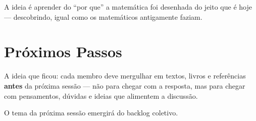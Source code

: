 \documentclass[12pt, a4paper]{article}
\begin{document}
\begin{citacao}
A ideia é aprender do ``por que'' a matemática foi desenhada do jeito que é hoje --- descobrindo, igual como os matemáticos antigamente faziam.
\end{citacao}

\section{Próximos Passos}

A ideia que ficou: cada membro deve mergulhar em textos, livros e referências \textbf{antes} da próxima sessão --- não para chegar com a resposta, mas para chegar com pensamentos, dúvidas e ideias que alimentem a discussão.

O tema da próxima sessão emergirá do backlog coletivo.
\end{document}
